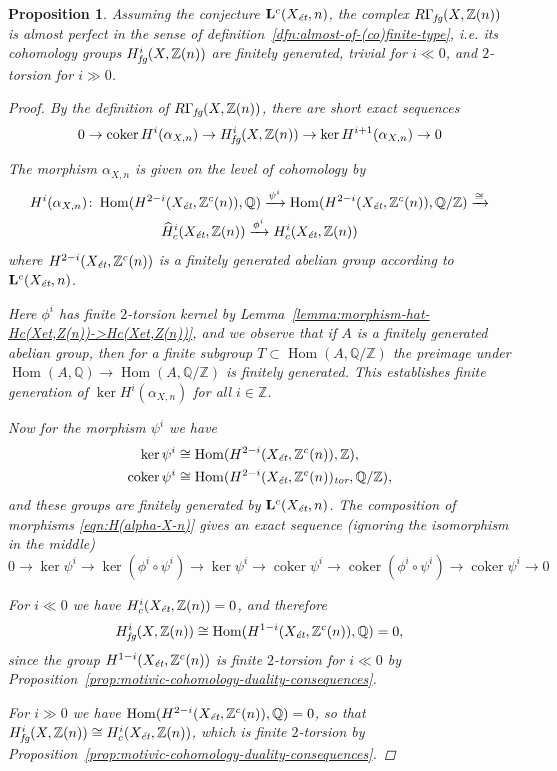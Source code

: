 \documentclass[leqno,12pt]{article}
\theoremstyle{plain}
\newtheorem{proposition}[theorem]{\indent\sc Proposition}
\theoremstyle{definition}
\DeclareMathOperator{\Hom}{Hom}
\DeclareMathOperator{\coker}{coker}
\newcommand{\QQ}{\mathbb{Q}}
\newcommand{\ZZ}{\mathbb{Z}}
\newcommand{\tor}{\text{\it tor}}
\newcommand{\et}{\text{\it \'{e}t}}
\newcommand{\fg}{\text{\it fg}}
\begin{document}
\begin{proposition}
  \label{prop:RGammafg-almost-perfect}
  Assuming the conjecture $\mathbf{L}^c (X_\et, n)$, the complex
  $R\Gamma_\fg (X, \ZZ (n))$ is almost perfect in the sense of
  definition~{\rm\ref{dfn:almost-of-(co)finite-type}}, i.e. its cohomology
  groups $H^i_\fg (X, \ZZ (n))$ are finitely generated, trivial for $i \ll 0$,
  and $2$-torsion for $i \gg 0$.

  \begin{proof}
    By the definition of $R\Gamma_\fg (X, \ZZ (n))$, there are short exact
    sequences
    \[ 0 \to \coker H^i (\alpha_{X,n}) \to
      H^i_\fg (X, \ZZ (n)) \to
      \ker H^{i+1} (\alpha_{X,n}) \to 0 \]

    The morphism $\alpha_{X,n}$ is given on the level of cohomology by
    \begin{multline}
      \label{eqn:H(alpha-X-n)}
      H^i (\alpha_{X,n})\colon
      \Hom (H^{2-i} (X_\et, \ZZ^c (n)), \QQ) \xrightarrow{\psi^i}
      \Hom (H^{2-i} (X_\et, \ZZ^c (n)), \QQ/\ZZ) \xrightarrow{\cong} \\
      \widehat{H}^i_c (X_\et, \ZZ (n)) \xrightarrow{\phi^i} H^i_c (X_\et, \ZZ (n))
    \end{multline}
    where $H^{2-i} (X_\et, \ZZ^c (n))$ is a finitely generated abelian group
    according to $\mathbf{L}^c (X_\et, n)$.

    Here $\phi^i$ has finite $2$-torsion kernel by
    Lemma~\ref{lemma:morphism-hat-Hc(Xet,Z(n))->Hc(Xet,Z(n))}, and we observe
    that if $A$ is a finitely generated abelian group, then for a finite
    subgroup $T \subset \Hom (A, \QQ/\ZZ)$ the preimage under
    $\Hom (A, \QQ) \to \Hom (A, \QQ/\ZZ)$ is finitely generated. This
    establishes finite generation of $\ker H^i (\alpha_{X,n})$ for all
    $i \in \ZZ$.

    Now for the morphism $\psi^i$ we have
    \begin{align*}
      \ker \psi^i & \cong \Hom (H^{2-i} (X_\et, \ZZ^c (n)), \ZZ), \\
      \coker \psi^i & \cong \Hom (H^{2-i} (X_\et, \ZZ^c (n))_\tor, \QQ/\ZZ),
    \end{align*}
    and these groups are finitely generated by $\mathbf{L}^c (X_\et, n)$. The
    composition of morphisms \eqref{eqn:H(alpha-X-n)} gives an exact sequence
    (ignoring the isomorphism in the middle)
    \[
      0 \to \ker\psi^i \to \ker (\phi^i\circ\psi^i) \to \ker\psi^i \to
      \coker\psi^i \to \coker (\phi^i\circ \psi^i) \to \coker\psi^i \to 0
    \]

    For $i \ll 0$ we have $H^i_c (X_\et, \ZZ (n)) = 0$, and therefore
    $$H^i_\fg (X, \ZZ (n)) \cong \Hom (H^{1-i} (X_\et, \ZZ^c (n)), \QQ) = 0,$$
    since the group $H^{1-i} (X_\et, \ZZ^c (n))$ is finite $2$-torsion for
    $i \ll 0$ by Proposition~\ref{prop:motivic-cohomology-duality-consequences}.

    For $i \gg 0$ we have $\Hom (H^{2-i} (X_\et, \ZZ^c (n)), \QQ) = 0$, so that
    $H^i_\fg (X, \ZZ (n)) \cong H^i_c (X_\et, \ZZ (n))$, which is finite
    $2$-torsion by
    Proposition~\ref{prop:motivic-cohomology-duality-consequences}.
  \end{proof}
\end{proposition}
\end{document}
